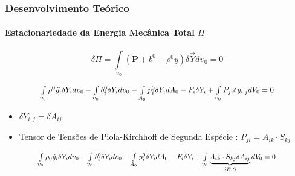 \documentclass{beamer}
\begin{document}
\begin{frame}
    \frametitle{Desenvolvimento Teórico}
        \framesubtitle{Estacionariedade da Energia Mecânica Total $\varPi$} 

        \begin{equation}
            \delta \varPi = \int\limits_{\upsilon_0} \left(\mathbf{P} + b^0 -\rho^0 \ddot{y} \right) \delta\vec{Y} d\upsilon_0 = 0
        \end{equation}

        \begin{equation}
            \scalebox{0.9}{$
            \int\limits_{\upsilon_0} \rho^0\ddot{y_i}\delta Y_i d\upsilon_0 - \int\limits_{\upsilon_0} b_i^0\delta Y_i d\upsilon_0 - \int\limits_{A_0} p_i^0\delta Y_i dA_0 - F_i\delta Y_i + \int\limits_{\upsilon_0} P_{ji}\delta y_{i,j}dV_0 = 0
            $}
        \end{equation}
        
        \begin{itemize}
            \item \(\delta Y_{i,j} = \delta A_{ij}\)
        \end{itemize}

                
        \begin{itemize}
            \item Tensor de Tensões de Piola-Kirchhoff de Segunda Espécie : \( P_{ji} = A_{ik}\cdot S_{kj} \) 
        \end{itemize}

        \begin{equation}
            \scalebox{0.85}{$
            \int\limits_{\upsilon_0} \rho_0\ddot{y_i}\delta Y_i d\upsilon_0 - \int\limits_{\upsilon_0} b_i^0\delta Y_i d\upsilon_0 - \int\limits_{A_0} p_i^0\delta Y_i dA_0 - F_i\delta Y_i + \int\limits_{\upsilon_0} \underbrace{A_{ik}\cdot S_{kj}\delta A_{ij}}_{\delta E : S}dV_0 = 0
            $}
        \end{equation}

\end{frame}
\end{document}
